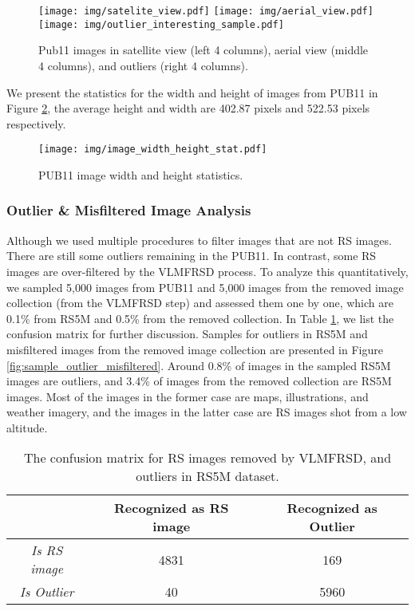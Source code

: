 \documentclass[journal]{IEEEtran}
\begin{document}
\begin{figure}[H]
    \centering
    \texttt{[image: img/satelite\_view.pdf]}
    \texttt{[image: img/aerial\_view.pdf]}
    \texttt{[image: img/outlier\_interesting\_sample.pdf]}
    \caption{Pub11 images in satellite view (left 4 columns), aerial view (middle 4 columns), and outliers (right 4 columns).}
    \label{fig:pub11_presentation}
\end{figure}


We present the statistics for the width and height of images from PUB11 in Figure \ref{fig:wh}, the average height and width are 402.87 pixels and 522.53 pixels respectively.

\begin{figure}[H]
    \centering
    \texttt{[image: img/image\_width\_height\_stat.pdf]}
    \caption{PUB11 image width and height statistics.}
    \label{fig:wh}
\end{figure}



\subsubsection{Outlier \& Misfiltered Image Analysis}
\label{appendix:outlier_analysis}
Although we used multiple procedures to filter images that are not RS images. There are still some outliers remaining in the PUB11. In contrast, some RS images are over-filtered by the VLMFRSD process. To analyze this quantitatively, we sampled 5,000 images from PUB11 and 5,000 images from the removed image collection (from the VLMFRSD step) and assessed them one by one, which are 0.1\% from RS5M and 0.5\% from the removed collection. In Table \ref{table:outlier_misfiltered}, we list the confusion matrix for further discussion. Samples for outliers in RS5M and misfiltered images from the removed image collection are presented in Figure \ref{fig:sample_outlier_misfiltered}. Around 0.8\% of images in the sampled RS5M images are outliers, and 3.4\% of images from the removed collection are RS5M images. Most of the images in the former case are maps, illustrations, and weather imagery, and the images in the latter case are RS images shot from a low altitude.

\begin{table}[H]
\caption{The confusion matrix for RS images removed by VLMFRSD, and outliers in RS5M dataset.}
\label{table:outlier_misfiltered}
\centering \begin{tabular}{|c|c|c|}\hline
  & Recognized as RS image & Recognized as Outlier \\ \hline
\textit{Is RS image} & 4831 & 169 \\ \hline
\textit{Is Outlier} & 40 & 5960 \\ \hline
\end{tabular}
\end{table}
\end{document}
